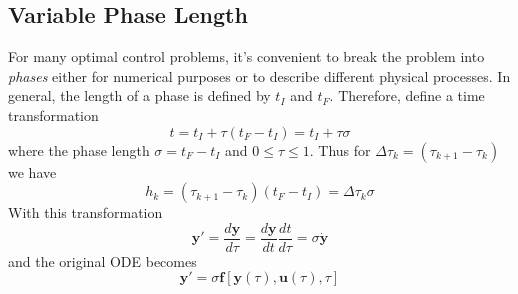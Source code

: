 \documentclass[]{article}
\begin{document}
\subsection{Variable Phase Length}
For many optimal control problems, it's convenient to break the problem into \textit{phases} either for numerical purposes or to describe different physical processes. In general, the length of a phase is defined by $t_I$ and $t_F$. Therefore, define a time transformation
\begin{equation}
    t = t_I + \tau (t_F - t_I) = t_I + \tau \sigma
\end{equation}
where the phase length $\sigma = t_F - t_I$ and $0 \leq \tau \leq 1$. Thus for $\Delta\tau_k = (\tau_{k+1} - \tau_k)$ we have
\begin{equation}
    h_k = (\tau_{k+1} - \tau_k)(t_F - t_I) = \Delta\tau_k \sigma
\end{equation}
With this transformation
\begin{equation}
    \mathbf{y}' = \frac{d\mathbf{y}}{d\tau} = \frac{d\mathbf{y}}{dt}\frac{dt}{d\tau}=\sigma \dot{\mathbf{y}}
\end{equation}
and the original ODE becomes
\begin{equation}
    \mathbf{y}' = \sigma \mathbf{f}\left[\mathbf{y}(\tau),\mathbf{u}(\tau),\tau\right]
\end{equation}
\end{document}
